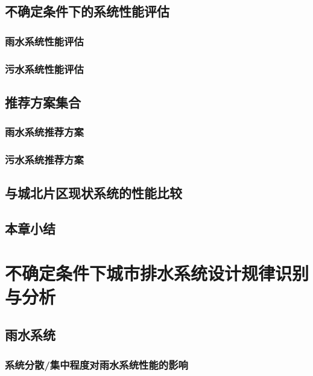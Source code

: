 \documentclass[degree=doctor]{thuthesis}
\begin{document}
\section{不确定条件下的系统性能评估}
\subsection{雨水系统性能评估}

\clearpage
\setcounter{page}{130}
\subsection{污水系统性能评估}

\clearpage
\setcounter{page}{134}
\section{推荐方案集合}
\subsection{雨水系统推荐方案}

\clearpage
\setcounter{page}{135}
\subsection{污水系统推荐方案}

\clearpage
\setcounter{page}{137}
\section{与城北片区现状系统的性能比较}

\clearpage
\setcounter{page}{139}
\section{本章小结}


\clearpage
\setcounter{page}{141}
\chapter{不确定条件下城市排水系统设计规律识别与分析}
\section{雨水系统}
\subsection{系统分散/集中程度对雨水系统性能的影响}
\end{document}
